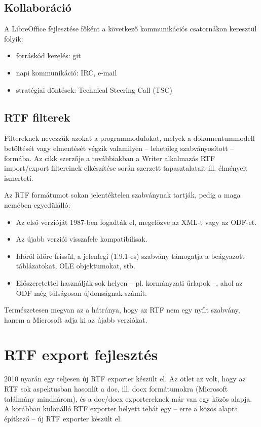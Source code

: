 \documentclass[a4paper]{report}
\begin{document}
\subsection*{Kollaboráció}

A LibreOffice fejlesztése főként a következő kommunikációs csatornákon keresztül folyik:

\begin{itemize}
\item forráskód kezelés: git
\item napi kommunikáció: IRC, e-mail
\item stratégiai döntések: Technical Steering Call (TSC)
\end{itemize}

\subsection*{RTF filterek}

Filtereknek nevezzük azokat a programmodulokat, melyek a dokumentummodell
betöltését vagy elmentését végzik valamilyen -- lehetőleg szabványosított --
formába. Az cikk szerzője a továbbiakban a Writer alkalmazás RTF import/export
filtereinek elkészítése során szerzett tapasztalatait ill. élményeit ismerteti.

Az RTF formátumot sokan jelentéktelen szabványnak tartják, pedig a maga nemében egyedülálló:

\begin{itemize}
\item Az első verzióját 1987-ben fogadták el, megelőzve az XML-t vagy az ODF-et.
\item Az újabb verziói visszafele kompatibilisak.
\item Időről időre frissül, a jelenlegi (1.9.1-es) szabvány támogatja a beágyazott táblázatokat, OLE objektumokat, stb.
\item Előszeretettel használják sok helyen -- pl. kormányzati űrlapok --, ahol az ODF
még túlságosan újdonságnak számít.
\end{itemize}

Természetesen megvan az a hátránya, hogy az RTF nem egy nyílt szabvány, hanem a
Microsoft adja ki az újabb verziókat.

\section{RTF export fejlesztés}

2010 nyarán egy teljesen új RTF exporter készült el. Az ötlet az volt, hogy az
RTF sok aspektusban hasonlít a doc, ill. docx formátumokra (Microsoft találmány mindhárom), és
a doc/docx exportereknek már van egy közös alapja. A korábban különálló RTF
exporter helyett tehát egy -- erre a közös alapra építkező -- új RTF exporter
készült el.
\end{document}
